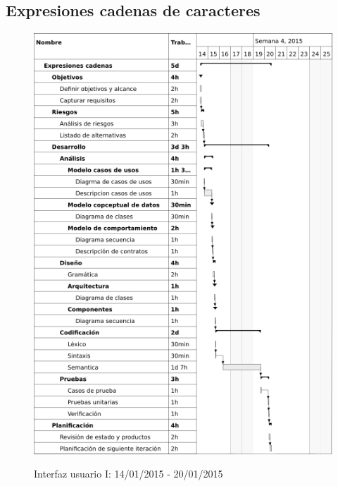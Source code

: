 \subsection{Expresiones cadenas de caracteres}
\begin{center}
\begin{figure}[H]
\centering
\includegraphics[scale=1]{planning/9-expresiones-cadenas.png} \\
\caption{Interfaz usuario I: 14/01/2015 - 20/01/2015 }
\end{figure}
\end{center}

